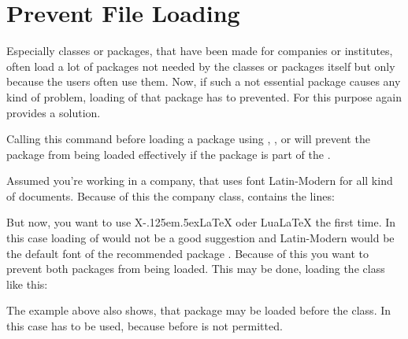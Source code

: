 \section{Prevent File Loading}

Especially classes or packages, that have
been made for companies or institutes, often load a lot of packages not needed
by the classes or packages itself but only because the users often use
them. Now, if such a not essential package causes any kind of problem, loading
of that package has to prevented. For this purpose  again
provides a solution.

\begin{Declaration}
\end{Declaration}
Calling this command before loading a
package using ,
, or
 will
prevent the package from being loaded effectively if the package is part of
the .
%
\begin{Example}
  Assumed you're working in a company, that uses font Latin-Modern for all
  kind of documents. Because of this the company class, 
  contains the lines:
\begin{lstcode}
  \RequirePackage[T1]{fontenc}
  \RequirePackage{lmodern}
\end{lstcode}
  But now, you want to use
  X\kern-.125em\lower.5ex\hbox{}\LaTeX{} oder Lua\LaTeX{} the
  first time. In this case loading of  would not be a good
  suggestion and Latin-Modern would be the default font of the recommended
  package . Because of this you want to prevent both
  packages from being loaded. This may be done, loading the class like this:
\end{Example}
The example above also shows, that package  may be loaded
before the class. In this case 
has to be used, because  before  is not
permitted.

